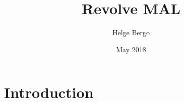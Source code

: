 \documentclass{article}
\title{Revolve MAL}
\author{Helge Bergo}
\date{May 2018}
\begin{document}



\section{Introduction}
\end{document}
